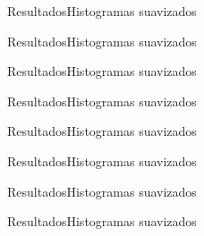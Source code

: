 \documentclass[10pt,xcolor={dvipsnames}]{beamer}
\begin{document}
\begin{frame}{Resultados}{Histogramas suavizados}
\begin{block}{}
	
\end{block}
\end{frame}

\begin{frame}{Resultados}{Histogramas suavizados}
\begin{block}{}
	
\end{block}
\end{frame}

\begin{frame}{Resultados}{Histogramas suavizados}
\begin{block}{}
	
\end{block}
\end{frame}

\begin{frame}{Resultados}{Histogramas suavizados}
\begin{block}{}
	
\end{block}
\end{frame}

\begin{frame}{Resultados}{Histogramas suavizados}
\begin{block}{}
	
\end{block}
\end{frame}

\begin{frame}{Resultados}{Histogramas suavizados}
\begin{block}{}
	
\end{block}
\end{frame}

\begin{frame}{Resultados}{Histogramas suavizados}
\begin{block}{}
	
\end{block}
\end{frame}

\begin{frame}{Resultados}{Histogramas suavizados}
\begin{block}{}
	
\end{block}
\end{frame}
\end{document}

